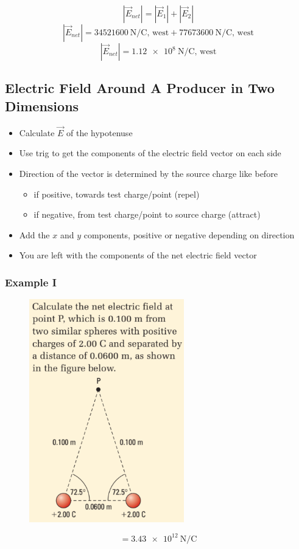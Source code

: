 \documentclass[a4paper,12pt]{article}
\begin{document}
$$|\vec{E}_{net}| = |\vec{E}_1| + |\vec{E}_2|$$
$$|\vec{E}_{net}| = \SI{34521600}{\newton\per\coulomb}\textrm{, west} + \SI{77673600}{\newton\per\coulomb}\textrm{, west}$$
$$|\vec{E}_{net}| = \SI{1.12e8}{\newton\per\coulomb}\textrm{, west}$$

\pagebreak
\subsection{Electric Field Around A Producer in Two Dimensions}
\begin{itemize}
    \item{Calculate $\vec{E}$ of the hypotenuse}
    \item{Use trig to get the components of the electric field vector on each side}
\item{
    Direction of the vector is determined by the source charge like before
        \begin{itemize}
            \item{if positive, towards test charge/point (repel)}
            \item{if negative, from test charge/point to source charge (attract)}
        \end{itemize}
    }
    \item{Add the $x$ and $y$ components, positive or negative depending on direction}
    \item{You are left with the components of the net electric field vector}
\end{itemize}

\subsubsection{Example I}
\begin{figure}[H]
    \centering
    \includegraphics[width=0.6\textwidth]{fieldtriangle}
\end{figure}
$$= \SI{3.43e12}{\newton\per\coulomb}$$
\end{document}
